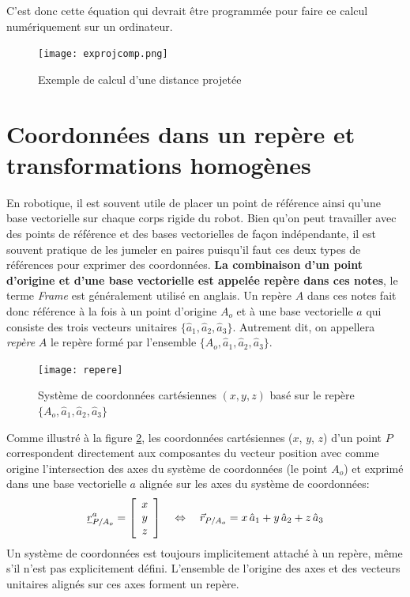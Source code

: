 C'est donc cette équation qui devrait être programmée pour faire ce calcul numériquement sur un ordinateur.
\begin{figure}[htbp]
	\centering
		\texttt{[image: exprojcomp.png]}
	\caption{Exemple de calcul d'une distance projetée}
	\label{fig:exprojcomp}
\end{figure}


\newpage
\section{Coordonnées dans un repère et transformations homogènes}
\label{sec:repere}

En robotique, il est souvent utile de placer un point de référence ainsi qu'une base vectorielle sur chaque corps rigide du robot. Bien qu'on peut travailler avec des points de référence et des bases vectorielles de façon indépendante, il est souvent pratique de les jumeler en paires puisqu'il faut ces deux types de références pour exprimer des coordonnées. \textbf{La combinaison d'un point d'origine et d'une base vectorielle est appelée repère dans ces notes}, le terme \textit{Frame} est généralement utilisé en anglais. Un repère $A$ dans ces notes fait donc référence à la fois à un point d'origine $A_o$ et à une base vectorielle $a$ qui consiste des trois vecteurs unitaires $\{ \hat{a}_1, \hat{a}_2, \hat{a}_3 \}$. Autrement dit, on appellera \textit{repère} $A$ le repère formé par l'ensemble $\{ A_o, \hat{a}_1, \hat{a}_2, \hat{a}_3 \}$. 
\begin{figure}[htpb]
	\centering
		\texttt{[image: repere]}
	\caption{Système de coordonnées cartésiennes $(x,y,z)$ basé sur le repère $\{A_o,\hat{a}_1,\hat{a}_2,\hat{a}_3\}$}
	\label{fig:repere}
\end{figure}

Comme illustré à la figure \ref{fig:repere}, les coordonnées cartésiennes ($x$, $y$, $z$) d'un point $P$ correspondent directement aux composantes du vecteur position avec comme origine l'intersection des axes du système de coordonnées (le point $A_o$) et exprimé dans une base vectorielle $a$ alignée sur les axes du système de coordonnées:
\begin{align}
\underline{r}_{P/A_o}^a = \left[ \begin{array}{c} 
x \\ y \\ z
\end{array} \right]   \quad \Leftrightarrow \quad
\vec{r}_{P/A_o} = x \, \hat{a}_{1} + y \, \hat{a}_{2} + z \, \hat{a}_{3}
\end{align} 
Un système de coordonnées est toujours implicitement attaché à un repère, même s'il n'est pas explicitement défini. L'ensemble de l'origine des axes et des vecteurs unitaires alignés sur ces axes forment un repère. 

